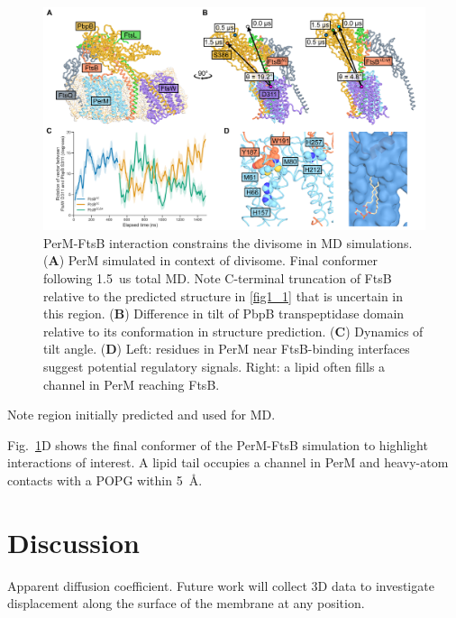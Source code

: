 \documentclass[pdflatex,sn-basic]{sn-jnl}%
\begin{document}
\loremipsum{}

\begin{figure}[h]
\centering
\includegraphics[width=1.0\textwidth]{../figures/fig5.png}
\caption{PerM-FtsB interaction constrains the \mtb{} divisome in MD simulations. (\textbf{A}) PerM simulated in context of \mtb{} divisome. Final conformer following \qty{1.5}{us} total MD. Note C-terminal truncation of FtsB relative to the predicted structure in \ref{fig1_1} that is uncertain in this region. (\textbf{B}) Difference in tilt of PbpB transpeptidase domain relative to its conformation in structure prediction. (\textbf{C}) Dynamics of tilt angle. (\textbf{D}) Left: residues in PerM near FtsB-binding interfaces suggest potential regulatory signals. Right: a lipid often fills a channel in PerM reaching FtsB.}\label{fig5}
\end{figure}

Note region initially predicted and used for MD.

Fig.~\ref{fig5}D shows the final conformer of the PerM-FtsB simulation to highlight interactions of interest.
A lipid tail occupies a channel in PerM and heavy-atom contacts with a POPG within \qty{5}{\angstrom}.

\section{Discussion}

Apparent diffusion coefficient. Future work will collect 3D data to investigate displacement along the surface of the membrane at any position.

\loremipsum{}

\loremipsum{}

\loremipsum{}

\loremipsum{}
\end{document}
